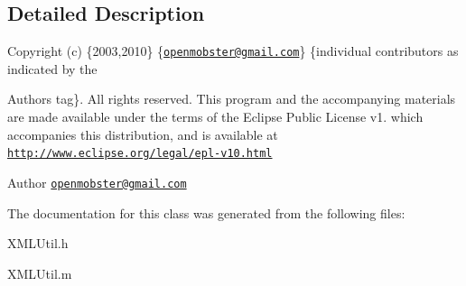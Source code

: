 \subsection{\-Detailed \-Description}
\-Copyright (c) \{2003,2010\} \{\href{mailto:openmobster@gmail.com}{\tt openmobster@gmail.\-com}\} \{individual contributors as indicated by the \begin{DoxyAuthor}{\-Authors}
tag\}. \-All rights reserved. \-This program and the accompanying materials are made available under the terms of the \-Eclipse \-Public \-License v1. which accompanies this distribution, and is available at \href{http://www.eclipse.org/legal/epl-v10.html}{\tt http\-://www.\-eclipse.\-org/legal/epl-\/v10.\-html}
\end{DoxyAuthor}
\begin{DoxyAuthor}{\-Author}
\href{mailto:openmobster@gmail.com}{\tt openmobster@gmail.\-com} 
\end{DoxyAuthor}


\-The documentation for this class was generated from the following files\-:\begin{DoxyCompactItemize}
\item 
\-X\-M\-L\-Util.\-h\item 
\-X\-M\-L\-Util.\-m\end{DoxyCompactItemize}
